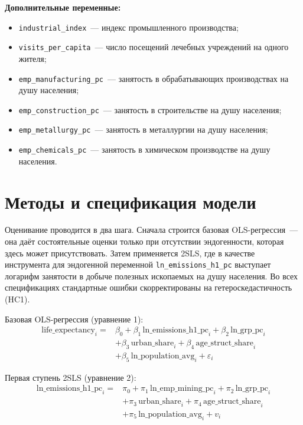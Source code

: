 \documentclass[10pt,a4paper]{article}
\begin{document}
\textbf{Дополнительные переменные:}
\begin{itemize}
  \item \texttt{industrial\_index}~--- индекс промышленного производства;
  \item \texttt{visits\_per\_capita}~--- число посещений лечебных учреждений на одного жителя;
  \item \texttt{emp\_manufacturing\_pc}~--- занятость в обрабатывающих производствах на душу населения;
  \item \texttt{emp\_construction\_pc}~--- занятость в строительстве на душу населения;
  \item \texttt{emp\_metallurgy\_pc}~--- занятость в металлургии на душу населения;
  \item \texttt{emp\_chemicals\_pc}~--- занятость в химическом производстве на душу населения.
\end{itemize}

\section*{Методы и спецификация модели}

Оценивание проводится в два шага. Сначала строится базовая OLS-регрессия~--- она даёт состоятельные оценки только при отсутствии эндогенности, которая здесь может присутствовать. Затем применяется 2SLS, где в качестве инструмента для эндогенной переменной \texttt{ln\_emissions\_h1\_pc} выступает логарифм занятости в добыче полезных ископаемых на душу населения. Во всех спецификациях стандартные ошибки скорректированы на гетероскедастичность (HC1).

Базовая OLS-регрессия (уравнение 1):
\begin{equation}
\label{eq:ols}
\begin{aligned}
\text{life\_expectancy}_i = {} & \beta_0 + \beta_1\,\text{ln\_emissions\_h1\_pc}_i + \beta_2\,\text{ln\_grp\_pc}_i \\
& + \beta_3\,\text{urban\_share}_i + \beta_4\,\text{age\_struct\_share}_i \\
& + \beta_5\,\text{ln\_population\_avg}_i + \varepsilon_i
\end{aligned}
\end{equation}

Первая ступень 2SLS (уравнение 2):
\begin{equation}
\label{eq:fs}
\begin{aligned}
\text{ln\_emissions\_h1\_pc}_i = {} & \pi_0 + \pi_1\,\text{ln\_emp\_mining\_pc}_i + \pi_2\,\text{ln\_grp\_pc}_i \\
& + \pi_3\,\text{urban\_share}_i + \pi_4\,\text{age\_struct\_share}_i \\
& + \pi_5\,\text{ln\_population\_avg}_i + v_i
\end{aligned}
\end{equation}
\end{document}
